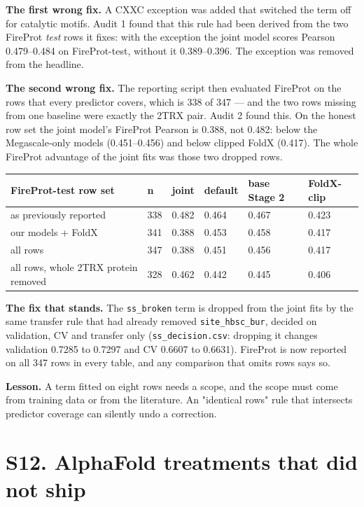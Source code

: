 \documentclass[11pt,a4paper]{article}
\begin{document}
\textbf{The first wrong fix.} A CXXC exception was added that switched the term off for catalytic motifs. Audit 1
found that this rule had been derived from the two FireProt \emph{test} rows it fixes: with the exception the joint
model scores Pearson 0.479--0.484 on FireProt-test, without it 0.389--0.396. The exception was removed from the
headline.

\textbf{The second wrong fix.} The reporting script then evaluated FireProt on the rows that every predictor covers,
which is 338 of 347 --- and the two rows missing from one baseline were exactly the 2TRX pair. Audit 2 found this.
On the honest row set the joint model's FireProt Pearson is 0.388, not 0.482: below the Megascale-only models
(0.451--0.456) and below clipped FoldX (0.417). The whole FireProt advantage of the joint fits was those two
dropped rows.

\begin{center}\scriptsize
\begin{tabular}{@{}llllll@{}}
\toprule
FireProt-test row set & n & joint & default & base Stage 2 & FoldX-clip \\
\midrule
as previously reported & 338 & 0.482 & 0.464 & 0.467 & 0.423 \\
our models + FoldX & 341 & 0.388 & 0.453 & 0.458 & 0.417 \\
all rows & 347 & 0.388 & 0.451 & 0.456 & 0.417 \\
all rows, whole 2TRX protein removed & 328 & 0.462 & 0.442 & 0.445 & 0.406 \\
\bottomrule
\end{tabular}\end{center}

\textbf{The fix that stands.} The \texttt{ss\_broken} term is dropped from the joint fits by the same transfer rule that had
already removed \texttt{site\_hbsc\_bur}, decided on validation, CV and transfer only (\texttt{ss\_decision.csv}: dropping it
changes validation 0.7285 to 0.7297 and CV 0.6607 to 0.6631). FireProt is now reported on all 347 rows in every
table, and any comparison that omits rows says so.

\textbf{Lesson.} A term fitted on eight rows needs a scope, and the scope must come from training data or from the
literature. An "identical rows" rule that intersects predictor coverage can silently undo a correction.



\section{S12. AlphaFold treatments that did not ship}
\end{document}
